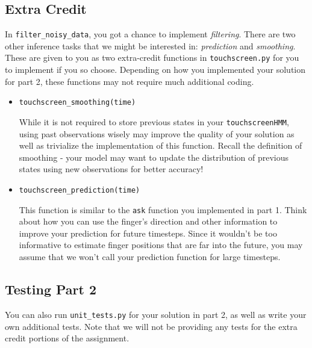 \documentclass{article}
\begin{document}
    \subsection{Extra Credit}
    In \texttt{filter\_noisy\_data}, you got a chance to implement \textit{filtering}. There are two other inference tasks that we might be interested in: \textit{prediction} and \textit{smoothing}. These are given to you as two extra-credit functions in \texttt{touchscreen.py} for you to implement if you so choose. Depending on how you implemented your solution for part 2, these functions may not require much additional coding.
    \begin{itemize}
    \item \texttt{touchscreen\_smoothing(time)}
    
    While it is not required to store previous states in your \texttt{touchscreenHMM}, using past observations wisely may improve the quality of your solution as well as trivialize the implementation of this function. Recall the definition of smoothing - your model may want to update the distribution of previous states using new observations for better accuracy! 
    \item \texttt{touchscreen\_prediction(time)}
    
    This function is similar to the \texttt{ask} function you implemented in part 1. Think about how you can use the finger's direction and other information to improve your prediction for future timesteps. Since it wouldn't be too informative to estimate finger positions that are far into the future, you may assume that we won't call your prediction function for large timesteps.
    \end{itemize}
    \subsection{Testing Part 2}
    You can also run \texttt{unit\_tests.py} for your solution in part 2, as well as write your own additional tests. Note that we will not be providing any tests for the extra credit portions of the assignment.\\
    
\end{document}
